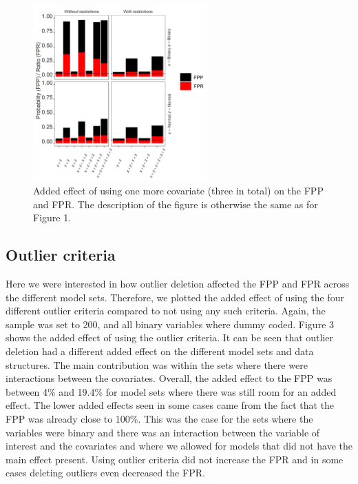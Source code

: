 \begin{figure}[hbt!]
\includegraphics[width=0.6\textwidth]{R/Analysis/Result/Figures/Figure1C.jpeg}
\centering
\caption{Added effect of using one more covariate (three in total) on the FPP and FPR. The description of the figure is otherwise the same as for Figure 1.}
\label{fig:mainfigure}
\end{figure}

\subsection{Outlier criteria}
Here we were interested in how outlier deletion affected the FPP and FPR across the different model sets. Therefore, we plotted the added effect of using the four different outlier criteria compared to not using any such criteria. Again, the sample was set to 200, and all binary variables where dummy coded. Figure 3 shows the added effect of using the outlier criteria. It can be seen that outlier deletion had a different added effect on the different model sets and data structures. The main contribution was within the sets where there were interactions between the covariates. Overall, the added effect to the FPP was between 4\% and 19.4\% for model sets where there was still room for an added effect. The lower added effects seen in some cases came from the fact that the FPP was already close to 100\%. This was the case for the sets where the variables were binary and there was an interaction between the variable of interest and the covariates and where we allowed for models that did not have the main effect present. Using outlier criteria did not increase the FPR and in some cases deleting outliers even decreased the FPR. 


